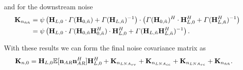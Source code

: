 and for the downstream noise
\begin{align}
\nonumber
\mathbf{K}_{n_{\tilde{n}\tilde{n}}}
&=\psi\left(\mathbf{H}_{L,0}\cdot\Gamma(\mathbf{H}_{0,\tilde{n}})+\Gamma(\mathbf{H}_{L,\tilde{n}})^{-1}\right)\cdot
\left(\Gamma(\mathbf{H}_{0,\tilde{n}})^H\cdot\mathbf{H}_{L,0}^H+\Gamma(\mathbf{H}_{L,\tilde{n}}^H)^{-1}\right)\\
&=\psi\left(\mathbf{H}_{L,0}\cdot\Gamma(\mathbf{H}_{0,\tilde{n}}\mathbf{H}_{0,\tilde{n}}^H)\cdot\mathbf{H}_{L,0}^H + \Gamma(\mathbf{H}_{L,\tilde{n}}\mathbf{H}_{L,\tilde{n}}^H)^{-1}\right).
\end{align}

With these results we can form the final noise covariance matrix as 
\begin{align}
\label{eq:noise_cov}
\mat{K}_{n,0}&= %
\mat{H}_{L,0}\mathbb{E}[\vec{n}_{AR}\vec{n}_{AR}^H]\mat{H}_{L,0}^H +
\mat{K}_{n_{LNA_{vv}}}+
\mat{K}_{n_{LNA_{cc}}}+
\mat{K}_{n_{LNA_{vc}}}+
\mat{K}_{n_{\tilde{n}\tilde{n}}}.
\end{align}









